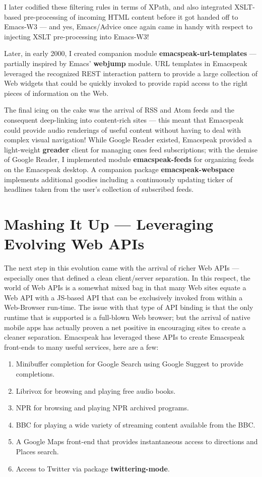\documentclass[11pt]{article}
\begin{document}
I later codified these filtering rules in terms of XPath, and
also integrated XSLT-based pre-processing of incoming HTML
content before it got handed off to Emacs-W3 — and yes,
Emacs/Advice once again came in handy with respect to injecting
XSLT pre-processing into Emacs-W3!

Later, in early 2000, I created companion module
\textbf{emacspeak-url-templates} — partially inspired by Emacs'
\textbf{webjump} module. URL templates in Emacspeak leveraged the
recognized REST interaction pattern to provide a large collection
of Web widgets that could be quickly invoked to provide rapid
access to the right pieces of information on the Web.

The final icing on the cake was the arrival of RSS and Atom feeds
and the consequent deep-linking into content-rich sites — this
meant that Emacspeak could provide audio renderings of useful
content without having to deal with complex visual navigation!
While Google Reader existed, Emacspeak provided a light-weight
\textbf{greader} client for managing ones feed subscriptions; with the
demise of Google Reader, I implemented module \textbf{emacspeak-feeds}
for organizing feeds on the Emacspeak desktop. A companion
package \textbf{emacspeak-webspace} implements additional goodies
including a continuously updating ticker of headlines taken from
the user's collection of subscribed feeds.


\section{Mashing It Up —  Leveraging Evolving Web APIs}
\label{sec:org83851f8}

The next step in this evolution came with the arrival of richer
Web APIs — especially ones that defined a clean client/server
separation. In this respect, the world of Web APIs is a somewhat
mixed bag in that many Web sites equate a Web API with a JS-based
API that can be exclusively invoked from within a Web-Browser
run-time. The issue with that type of API binding is that the
only runtime that is supported is a full-blown Web browser; but
the arrival of native mobile apps has actually proven a net
positive in encouraging sites to create a cleaner
separation. Emacspeak has leveraged these APIs to create
Emacspeak front-ends to many useful services, here are a few:

\begin{enumerate}
\item Minibuffer completion for Google Search using Google Suggest
to provide completions.
\item Librivox for browsing  and playing free audio books.
\item NPR  for browsing and playing NPR archived programs.
\item BBC for playing a wide variety of streaming content
available from the BBC.
\item A Google Maps front-end that  provides instantaneous access
to directions and Places search.
\item Access to Twitter via package \textbf{twittering-mode}.
\end{enumerate}
\end{document}
